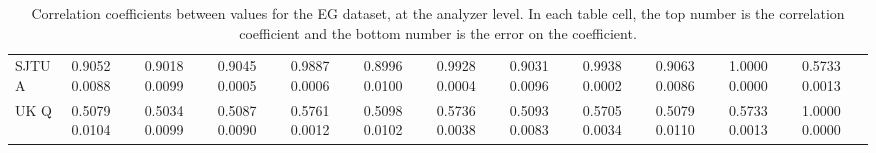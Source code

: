 \begin{landscape}
\begin{table}
\begin{tabularx}{1\linewidth}{@{\extracolsep{\fill}}lXXXXXXXXXXX}
	SJTU A & 0.9052 0.0088 & 0.9018 0.0099 & 0.9045 0.0005 & 0.9887 0.0006 & 0.8996 0.0100 & 0.9928 0.0004 & 0.9031 0.0096 & 0.9938 0.0002 & 0.9063 0.0086 & 1.0000 0.0000 & 0.5733 0.0013  \\
	UK Q   & 0.5079 0.0104 & 0.5034 0.0099 & 0.5087 0.0090 & 0.5761 0.0012 & 0.5098 0.0102 & 0.5736 0.0038 & 0.5093 0.0083 & 0.5705 0.0034 & 0.5079 0.0110 & 0.5733 0.0013 & 1.0000 0.0000  \\
  \bottomrule
\end{tabularx}
\caption[]{Correlation coefficients between \R values for the EG dataset, at the analyzer level. In each table cell, the top number is the correlation coefficient and the bottom number is the error on the coefficient.}
\label{tab:Corrs_EG_analyzer}
\end{table}
\end{landscape}


